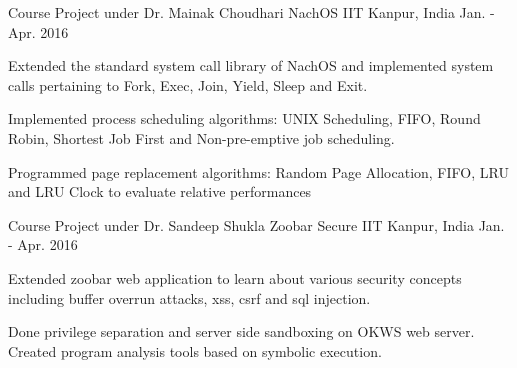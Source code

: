 \begin{cventries}
	\cventry
	{Course Project under Dr. Mainak Choudhari} %
	{NachOS} %
	{IIT Kanpur, India} %
	{Jan. - Apr. 2016} %
	{
		\begin{cvitems} %
			\item Extended the standard system call library of NachOS and implemented system calls pertaining to Fork, Exec, Join, Yield, Sleep and Exit.
			\item Implemented process scheduling algorithms: UNIX Scheduling, FIFO, Round Robin, Shortest Job First and Non-pre-emptive job scheduling.
			\item Programmed page replacement algorithms: Random Page Allocation, FIFO, LRU and LRU Clock to evaluate relative performances
		\end{cvitems}
	}
	\cventry
	{Course Project under Dr. Sandeep Shukla} %
	{Zoobar Secure} %
	{IIT Kanpur, India} %
	{Jan. - Apr. 2016} %
	{
		\begin{cvitems} %
			\item Extended zoobar web application to learn about various security concepts including buffer overrun attacks, xss, csrf and sql injection.
			\item Done privilege separation and server side sandboxing on OKWS web server. Created program analysis tools based on symbolic execution.
		\end{cvitems}
	}
	
	\iffalse
	\cventry
	{Subtitle Downloader} %
	{Open Source Projects} %
	{IIT Kanpur, India} %
	{Dec. 2013} %
	{
		\begin{cvitems} %
			\item Wrote a python script that scrapes and extract the subtitle from subscene.com.
		\end{cvitems}
	}
	
	\cventry
	{IITK FB Forum App} %
	{} %
	{} %
	{May 2014} %
	{
		\begin{cvitems} %
			\item Created an online discussion website for students and connected it with Facebook to make it more user friendly
			\item Used PHP and PostgreSQL for back-end and hosted application on Heroku. Used Facebook SDK for JavaScript for facebook login and Canvas frame for user interface
		\end{cvitems}
	}
	\fi
\end{cventries}